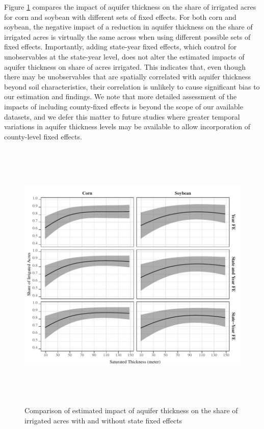 \documentclass[
]{article}
\begin{document}
Figure \ref{fig:state-fe-with-without} compares the impact of aquifer thickness on the share of irrigated acres for corn and soybean with different sets of fixed effects. For both corn and soybean, the negative impact of a reduction in aquifer thickness on the share of irrigated acres is virtually the same across when using different possible sets of fixed effects. Importantly, adding state-year fixed effects, which control for unobservables at the state-year level, does not alter the estimated impacts of aquifer thickness on share of acres irrigated. This indicates that, even though there may be unobservables that are spatially correlated with aquifer thickness beyond soil characteristics, their correlation is unlikely to cause significant bias to our estimation and findings. We note that more detailed assessment of the impacts of including county-fixed effects is beyond the scope of our available datasets, and we defer this matter to future studies where greater temporal variations in aquifer thickness levels may be available to allow incorporation of county-level fixed effects.

\begin{figure}[H]

{\centering \includegraphics[width=6in,height=500px,]{../../Figures/g_share_comp} 

}

\caption{Comparison of estimated impact of aquifer thickness on the share of irrigated acres with and without state fixed effects}\label{fig:state-fe-with-without}
\end{figure}
\end{document}
